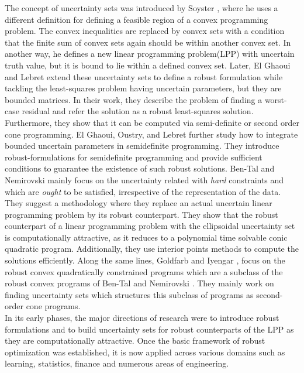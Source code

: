 \documentclass[a4paper,12pt,twoside]{article}
\begin{document}
The concept of uncertainty sets was introduced by Soyster \cite{soyster}, where he uses a different  definition for defining a feasible region of a convex programming problem. The convex inequalities are replaced by convex sets with a condition that the finite sum of convex sets again should be within another convex set. In another way, he defines a new linear programming problem(LPP) with uncertain truth value, but it is bound to lie within a defined convex set. Later, El Ghaoui and Lebret \cite{elg_lsq} extend these uncertainty sets to define a robust formulation while tackling the least-squares problem having uncertain parameters, but they are bounded matrices. In their work, they describe the problem of finding a worst-case residual and refer the solution as a robust least-squares solution. Furthermore, they show that it can be computed via semi-definite or second order cone programming. El Ghaoui, Oustry, and Lebret \cite{elg_semidefinite} further study how to integrate bounded uncertain parameters in semidefinite programming. They introduce robust-formulations for semidefinite programming and provide sufficient conditions to guarantee the existence of such robust solutions. Ben-Tal and Nemirovski \cite{bental_rc} mainly focus on the uncertainty related with \textit{hard} constraints and which are \textit{ought} to be satisfied, irrespective of the representation of the data. They suggest a methodology where they replace an actual uncertain linear programming problem by its robust counterpart. They show that the robust counterpart  of a linear programming problem with the ellipsoidal uncertainty set is computationally attractive, as it reduces to a polynomial time solvable conic quadratic program. Additionally, they use interior points methods \cite{bental_interior} to compute the solutions efficiently. Along the same lines, Goldfarb and Iyengar \cite{Goldfarb}, focus on the robust convex quadratically constrained programs which are a subclass of the robust convex programs of Ben-Tal and Nemirovski \cite{bental_rc}. They mainly work on finding uncertainty sets which structures this subclass of programs as second-order cone programs. \\

In its early phases, the major directions of research were to introduce robust formulations and to build uncertainty sets for robust counterparts of the LPP as they are computationally attractive. Once the basic framework of robust optimization was established, it is now applied across various domains such as learning, statistics, finance and numerous areas of engineering.
\end{document}
